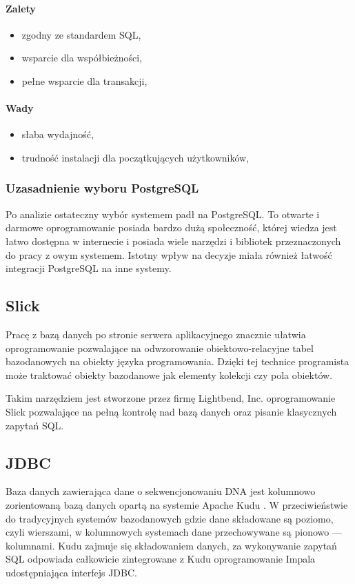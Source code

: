 \documentclass[a4paper,12pt,twoside]{article}
\begin{document}
\paragraph{Zalety}
\begin{itemize}
\item{zgodny ze standardem SQL},
\item{wsparcie dla współbieżności},
\item{pełne wsparcie dla transakcji},
\end{itemize}
\paragraph{Wady}
\begin{itemize}
\item{słaba wydajność},
\item{trudność instalacji dla początkujących użytkowników},
\end{itemize}

\subsubsection{Uzasadnienie wyboru PostgreSQL}
Po analizie ostateczny wybór systemem padł na PostgreSQL.
To otwarte i darmowe oprogramowanie posiada bardzo dużą społeczność, której wiedza jest łatwo dostępna w internecie 
i posiada wiele narzędzi i bibliotek przeznaczonych do pracy z owym systemem. 
Istotny wpływ na decyzje miała również łatwość integracji PostgreSQL na inne systemy.  

\subsection{Slick}  
Pracę z bazą danych po stronie serwera aplikacyjnego 
znacznie ułatwia oprogramowanie pozwalające na odwzorowanie obiektowo-relacyjne tabel bazodanowych na obiekty języka programowania.
Dzięki tej technice programista może traktować obiekty bazodanowe jak elementy kolekcji czy pola obiektów.

Takim narzędziem jest stworzone przez firmę Lightbend, Inc. 
oprogramowanie Slick\cite{slick} pozwalające na pełną kontrolę nad bazą danych oraz pisanie klasycznych zapytań SQL.

\subsection{JDBC}  
Baza danych zawierająca dane o sekwencjonowaniu DNA jest kolumnowo zorientowaną bazą danych opartą na systemie Apache Kudu \cite{kudu}. W przeciwieństwie do tradycyjnych systemów bazodanowych gdzie dane składowane są poziomo, czyli wierszami, w kolumnowych systemach dane przechowywane są pionowo — kolumnami.
Kudu zajmuje się składowaniem danych, za wykonywanie zapytań SQL
odpowiada całkowicie zintegrowane z Kudu oprogramowanie Impala \cite{impala} \cite{impalaArt} udostępniająca interfejs JDBC.
\end{document}
